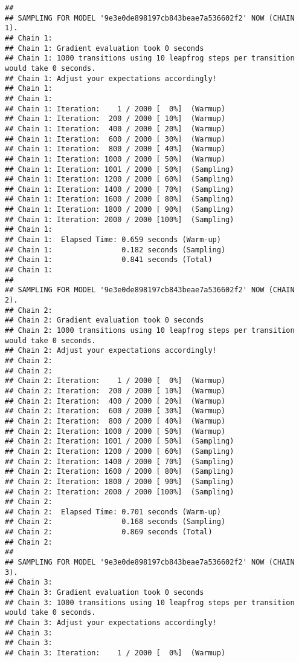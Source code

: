 \documentclass[
]{article}
\begin{document}
\begin{verbatim}
## 
## SAMPLING FOR MODEL '9e3e0de898197cb843beae7a536602f2' NOW (CHAIN 1).
## Chain 1: 
## Chain 1: Gradient evaluation took 0 seconds
## Chain 1: 1000 transitions using 10 leapfrog steps per transition would take 0 seconds.
## Chain 1: Adjust your expectations accordingly!
## Chain 1: 
## Chain 1: 
## Chain 1: Iteration:    1 / 2000 [  0%]  (Warmup)
## Chain 1: Iteration:  200 / 2000 [ 10%]  (Warmup)
## Chain 1: Iteration:  400 / 2000 [ 20%]  (Warmup)
## Chain 1: Iteration:  600 / 2000 [ 30%]  (Warmup)
## Chain 1: Iteration:  800 / 2000 [ 40%]  (Warmup)
## Chain 1: Iteration: 1000 / 2000 [ 50%]  (Warmup)
## Chain 1: Iteration: 1001 / 2000 [ 50%]  (Sampling)
## Chain 1: Iteration: 1200 / 2000 [ 60%]  (Sampling)
## Chain 1: Iteration: 1400 / 2000 [ 70%]  (Sampling)
## Chain 1: Iteration: 1600 / 2000 [ 80%]  (Sampling)
## Chain 1: Iteration: 1800 / 2000 [ 90%]  (Sampling)
## Chain 1: Iteration: 2000 / 2000 [100%]  (Sampling)
## Chain 1: 
## Chain 1:  Elapsed Time: 0.659 seconds (Warm-up)
## Chain 1:                0.182 seconds (Sampling)
## Chain 1:                0.841 seconds (Total)
## Chain 1: 
## 
## SAMPLING FOR MODEL '9e3e0de898197cb843beae7a536602f2' NOW (CHAIN 2).
## Chain 2: 
## Chain 2: Gradient evaluation took 0 seconds
## Chain 2: 1000 transitions using 10 leapfrog steps per transition would take 0 seconds.
## Chain 2: Adjust your expectations accordingly!
## Chain 2: 
## Chain 2: 
## Chain 2: Iteration:    1 / 2000 [  0%]  (Warmup)
## Chain 2: Iteration:  200 / 2000 [ 10%]  (Warmup)
## Chain 2: Iteration:  400 / 2000 [ 20%]  (Warmup)
## Chain 2: Iteration:  600 / 2000 [ 30%]  (Warmup)
## Chain 2: Iteration:  800 / 2000 [ 40%]  (Warmup)
## Chain 2: Iteration: 1000 / 2000 [ 50%]  (Warmup)
## Chain 2: Iteration: 1001 / 2000 [ 50%]  (Sampling)
## Chain 2: Iteration: 1200 / 2000 [ 60%]  (Sampling)
## Chain 2: Iteration: 1400 / 2000 [ 70%]  (Sampling)
## Chain 2: Iteration: 1600 / 2000 [ 80%]  (Sampling)
## Chain 2: Iteration: 1800 / 2000 [ 90%]  (Sampling)
## Chain 2: Iteration: 2000 / 2000 [100%]  (Sampling)
## Chain 2: 
## Chain 2:  Elapsed Time: 0.701 seconds (Warm-up)
## Chain 2:                0.168 seconds (Sampling)
## Chain 2:                0.869 seconds (Total)
## Chain 2: 
## 
## SAMPLING FOR MODEL '9e3e0de898197cb843beae7a536602f2' NOW (CHAIN 3).
## Chain 3: 
## Chain 3: Gradient evaluation took 0 seconds
## Chain 3: 1000 transitions using 10 leapfrog steps per transition would take 0 seconds.
## Chain 3: Adjust your expectations accordingly!
## Chain 3: 
## Chain 3: 
## Chain 3: Iteration:    1 / 2000 [  0%]  (Warmup)

\end{verbatim}
\end{document}
